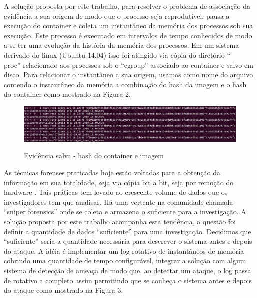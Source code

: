 \documentclass[
	12pt,				%
	openright,			%
	oneside,			%
	a4paper,			%
	english,			%
	french,				%
	spanish,			%
	brazil,				%
	]{abntex2}
\begin{document}
A solução proposta por este trabalho, para resolver o problema de associação da evidência a sua origem de modo que o processo seja reprodutível, pausa a execução
do container e coleta um instantâneo da memória dos processos sob sua execução. Este processo é executado em intervalos de tempo conhecidos de modo a se ter uma
evolução da história da memória dos processos. Em um sistema derivado do linux (Ubuntu 14.04) isso foi atingido via cópia do diretório ``\\proc'' relacionado 
aos processos sob o ``cgroup'' associado ao container e salvo em disco. Para relacionar o instantâneo a sua origem, usamos como nome do arquivo contendo o instantâneo 
da memória a combinação do hash da imagem e o hash do container como mostrado na Figura 2.

\begin{figure}[h!]
\caption{Evidência salva - hash do container e imagem}
\includegraphics[scale=0.3]{snapshot.jpg}
\centering
\label{fig:instantaneo}
\end{figure}

As técnicas forenses praticadas hoje estão voltadas para a obtenção da informação em sua totalidade, seja via cópia bit a bit, seja por remoção do hardware \cite{Simou2014}
\cite{Bem2008}. Tais práticas tem levado ao crescente volume de dados que os investigadores tem que analisar. Há uma vertente na comunidade chamada ``sniper 
forensics'' onde se coleta e armazena o suficiente para a investigação. A solução proposta por este trabalho acompanha esta tendência, a questão foi definir a quantidade 
de dados ``suficiente'' para uma investigação. Decidimos que ``suficiente'' seria a quantidade necessária para descrever o sistema antes e depois do ataque. A idéia é 
implementar um log rotativo de instantâneos de memória cobrindo uma quantidade de tempo configurável, integrar a solução com algum sistema de detecção de ameaça de modo
que, ao detectar um ataque, o log passa de rotativo a completo assim permitindo que se conheça o sistema antes e depois do ataque como mostrado na Figura 3. 
\end{document}
